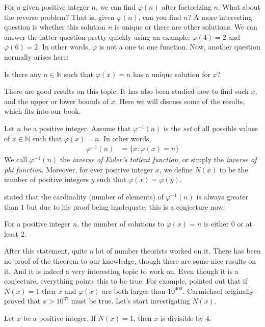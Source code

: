 \documentclass[main.tex]{subfile}
\begin{document}
	For a given positive integer $n$, we can find $\varphi(n)$ after factorizing $n$. What about the reverse problem? That is, given $\varphi(n)$, can you find $n$? A more interesting question is whether this solution $n$ is unique or there are other solutions. We can answer the latter question pretty quickly using an example: $\varphi(4)=2$ and $\varphi (6)=2$. In other words, $\varphi $ is not a one to one function. Now, another question normally arises here:
		\begin{problem}
			Is there any $n\in\mathbb{N}$ such that $\varphi(x)=n$ has a unique solution for $x$?
		\end{problem}
	There are good results on this topic. It has also been studied how to find such $x$, and the upper or lower bounds of $x$. Here we will discuss some of the results, which fits into our book.
		\begin{definition}
			Let $n$ be a positive integer. Assume that $\varphi ^{-1}(n)$ is the \textit{set} of all possible values of $x\in\mathbb{N} $ such that $\varphi (x)=n$. In other words,
				\begin{align*}
					\varphi^{-1}(n) & = \{x:\varphi(x)=n\}
				\end{align*}
			We call $\varphi^{-1}(n)$ the \textit{inverse of Euler's totient function}, or simply the \textit{inverse of phi function}. Moreover, for ever positive integer $x$, we define $N(x)$ to be the number of positive integers $y$ such that $\varphi(x)=\varphi(y)$.
		\end{definition}

	\textcite{carmichael_1907} stated that the cardinality (number of elements) of $\varphi^{-1}(n)$ is always greater than $1$ but due to his proof being inadequate, this is a conjecture now:
		\begin{conjecture}
			For a positive integer $n$, the number of solutions to $\varphi(x)=n$ is either $0$ or at least $2$.
		\end{conjecture}
	After this statement, quite a lot of number theorists worked on it. There has been no proof of the theorem to our knowledge, though there are some nice results on it. And it is indeed a very interesting topic to work on. Even though it is a conjecture, everything points this to be true. For example, \textcite{jr._1947} pointed out that if $N(x)=1$ then $x$ and $\varphi(x)$ are both larger than $10^{400}$. Carmichael originally proved that $x>10^{37}$ must be true. Let's start investigating $N(x)$.
		\begin{theorem}
			Let $x$ be a positive integer. If $N(x)=1$, then $x$ is divisible by $4$.
		\end{theorem}
\end{document}
